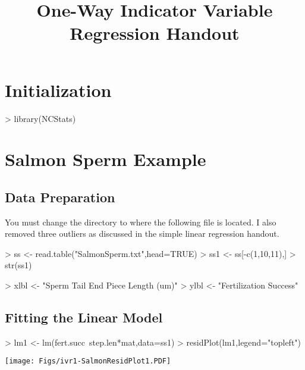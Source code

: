 \documentclass[a4paper]{article}
\begin{document}
\title{One-Way Indicator Variable Regression Handout}
\date{}  %
\maketitle
\vspace{-72pt}


\section{Initialization} \label{sect:Inits}
\vspace{-18pt}
\begin{Schunk}
\begin{Sinput}
> library(NCStats)
\end{Sinput}
\end{Schunk}
\vspace{-18pt}

\section{Salmon Sperm Example}
\subsection{Data Preparation}
You must change the directory to where the following file is located.  I also removed three outliers as discussed in the simple linear regression handout.
\begin{Schunk}
\begin{Sinput}
> ss <- read.table("SalmonSperm.txt",head=TRUE)
> ss1 <- ss[-c(1,10,11),]
> str(ss1)
\end{Sinput}
\begin{Sinput}
> xlbl <- "Sperm Tail End Piece Length (um)"
> ylbl <- "Fertilization Success"
\end{Sinput}
\end{Schunk}

\subsection{Fitting the Linear Model}
\begin{Schunk}
\begin{Sinput}
> lm1 <- lm(fert.succ~step.len*mat,data=ss1)
> residPlot(lm1,legend="topleft")
\end{Sinput}
\end{Schunk}
\texttt{[image: Figs/ivr1-SalmonResidPlot1.PDF]}
\end{document}
